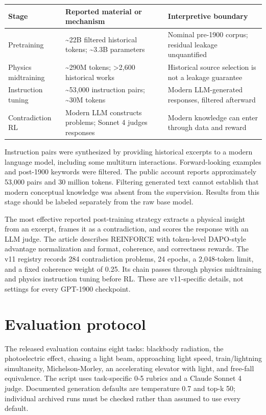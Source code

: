 \documentclass[10pt,a4paper]{article}
\begin{document}
\medskip{}\par\smallskip
{\small
\begin{tabularx}{\linewidth}{@{}>{\raggedright\arraybackslash}X>{\raggedright\arraybackslash}X>{\raggedright\arraybackslash}X@{}}
\toprule
\textbf{Stage} & \textbf{Reported material or mechanism} & \textbf{Interpretive boundary} \\
\midrule
Pretraining & \textasciitilde{}22B filtered historical tokens; \textasciitilde{}3.3B parameters & Nominal pre-1900 corpus; residual leakage unquantified \\
Physics midtraining & \textasciitilde{}290M tokens; >2,600 historical works & Historical source selection is not a leakage guarantee \\
Instruction tuning & \textasciitilde{}53,000 instruction pairs; \textasciitilde{}30M tokens & Modern LLM-generated responses, filtered afterward \\
Contradiction RL & Modern LLM constructs problems; Sonnet 4 judges responses & Modern knowledge can enter through data and reward \\
\bottomrule
\end{tabularx}
}\par\medskip
Instruction pairs were synthesized by providing historical excerpts to a modern language model, including some multiturn interactions. Forward-looking examples and post-1900 keywords were filtered. The public account reports approximately 53,000 pairs and 30 million tokens. Filtering generated text cannot establish that modern conceptual knowledge was absent from the supervision. Results from this stage should be labeled separately from the raw base model. \cite{ref1}

The most effective reported post-training strategy extracts a physical insight from an excerpt, frames it as a contradiction, and scores the response with an LLM judge. The article describes REINFORCE with token-level DAPO-style advantage normalization and format, coherence, and correctness rewards. The v11 registry records 284 contradiction problems, 24 epochs, a 2,048-token limit, and a fixed coherence weight of 0.25. Its chain passes through physics midtraining and physics instruction tuning before RL. These are v11-specific details, not settings for every GPT-1900 checkpoint. \cite{ref1,ref4}

\section{Evaluation protocol}
The released evaluation contains eight tasks: blackbody radiation, the photoelectric effect, chasing a light beam, approaching light speed, train/lightning simultaneity, Michelson-Morley, an accelerating elevator with light, and free-fall equivalence. The script uses task-specific 0-5 rubrics and a Claude Sonnet 4 judge. Documented generation defaults are temperature 0.7 and top-k 50; individual archived runs must be checked rather than assumed to use every default. \cite{ref2,ref3}
\end{document}
